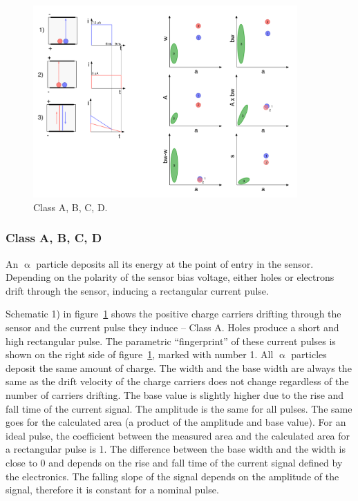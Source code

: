 \begin{figure}[]
\centering
\includegraphics[width=0.9\textwidth]{05_current_monitoring/plots/classABCD}
\caption{Class A, B, C, D.}
\label{fig:classabcd}
\end{figure}
\clearpage
\subsubsection{Class A, B, C, D}
\label{sec:classabcd}%
An $\upalpha$ particle deposits all its energy at the point of entry in the sensor. Depending on the polarity of the sensor bias voltage, either holes or electrons drift through the sensor, inducing a rectangular current pulse. 

Schematic 1) in figure~\ref{fig:classabcd} shows the positive charge carriers drifting through the sensor and the current pulse they induce -- Class A. Holes produce a short and high rectangular pulse. The parametric ``fingerprint'' of these current pulses is shown on the right side of figure~\ref{fig:classabcd}, marked with number 1. All $\upalpha$ particles deposit the same amount of charge.
The width and the base width are always the same as the drift velocity of the charge carriers does not change regardless of the number of carriers drifting. The base value is slightly higher due to the rise and fall time of the current signal. The amplitude is the same for all pulses. The same goes for the calculated area (a product of the amplitude and base value). For an ideal pulse, the coefficient between the measured area and the calculated area for a rectangular pulse is 1. The difference between the base width and the width is close to 0 and depends on the rise and fall time of the current signal defined by the electronics. The falling slope of the signal depends on the amplitude of the signal, therefore it is constant for a nominal pulse. 

